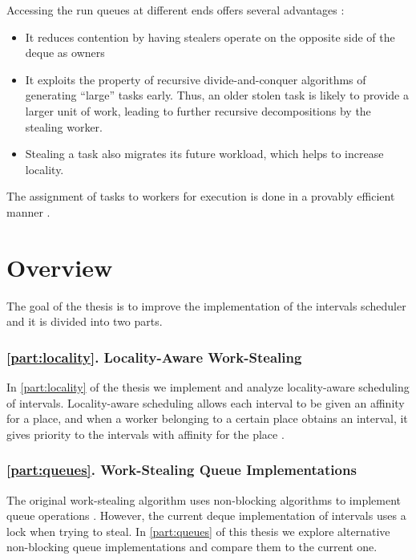 Accessing the run queues at different ends offers several advantages
\cite{Frigo1998}:

\begin{itemize}
\item It reduces contention by having stealers operate on the opposite
  side of the deque as owners
\item It exploits the property of recursive divide-and-conquer
  algorithms of generating ``large'' tasks early. Thus, an older
  stolen task is likely to provide a larger unit of work, leading to
  further recursive decompositions by the stealing worker.
\item Stealing a task also migrates its future workload, which helps
  to increase locality.
\end{itemize}

The assignment of tasks to workers for execution is done in a provably
efficient manner \cite{Blumofe1995, Blumofe1999}.


\section{Overview}
\label{sec:intro-overview}

The goal of the thesis is to improve the implementation of the
intervals scheduler and it is divided into two parts.


\subsubsection{\autoref{part:locality}. Locality-Aware Work-Stealing}

In \autoref{part:locality} of the thesis we implement and analyze
locality-aware scheduling of intervals. Locality-aware scheduling
allows each interval to be given an affinity for a place, and when a
worker belonging to a certain place obtains an interval, it gives
priority to the intervals with affinity for the place \cite{Acar2002,
  Guo2010}.

\subsubsection{\autoref{part:queues}. Work-Stealing Queue
  Implementations}

The original work-stealing algorithm uses non-blocking algorithms to
implement queue operations \cite{Arora2001}. However, the current
deque implementation of intervals uses a lock when trying to steal. In
\autoref{part:queues} of this thesis we explore alternative
non-blocking queue implementations and compare them to the current
one.

